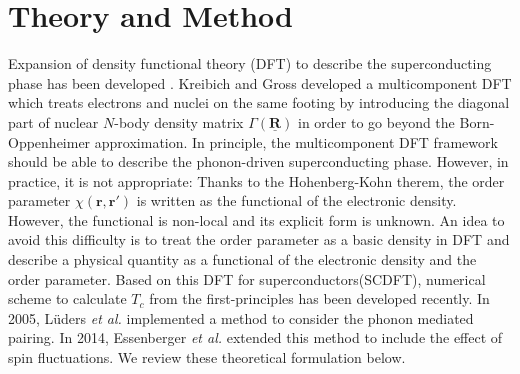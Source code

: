 

%
%
\chapter{Theory and Method}
%
%
%
%
Expansion of density functional theory\cite{HK1964,KS1965} (DFT) to describe the superconducting phase 
has been developed
. Kreibich and Gross\cite{Kreibich2001} developed a multicomponent DFT which treats electrons and 
nuclei on the same footing by introducing the diagonal part of nuclear $N$-body density matrix 
$\Gamma(\underline{\bm R})$ in order to go beyond the Born-Oppenheimer approximation.
In principle, the multicomponent DFT framework should be able to describe the phonon-driven 
superconducting phase. However, in practice, it is not appropriate: Thanks to the 
Hohenberg-Kohn therem\cite{HK1964}, the order parameter $\chi(\bm r, \bm r')$ is written as the 
functional of the electronic density. However, the functional is non-local and its explicit form 
is unknown. An idea\cite{Oliveira1988} to avoid this difficulty 
is to treat the order parameter as a basic density in DFT and describe a physical quantity
as a functional of the electronic density and the order parameter.
Based on this DFT for superconductors(SCDFT), numerical scheme to calculate $T_c$ from the
first-principles has been developed recently. In 2005, L\"{u}ders {\it et al.} implemented a 
method\cite{Luders2005} to consider the phonon mediated pairing. In 2014, Essenberger {\it et al.}
\cite{Essenberger2014} extended this method to include the effect of spin fluctuations.
We review these theoretical formulation below.

